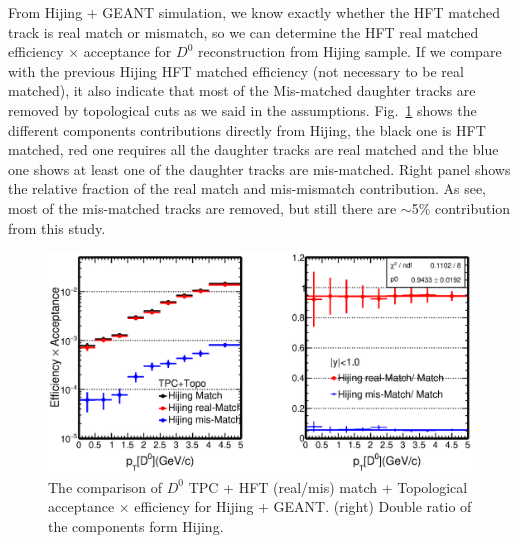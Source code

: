 

From Hijing + GEANT simulation, we know exactly whether the HFT matched track is real match or mismatch, so we can determine the HFT real matched efficiency $\times$ acceptance for $D^0$ reconstruction from Hijing sample. If we compare with the previous Hijing HFT matched efficiency (not necessary to be real matched), it also indicate that most of the Mis-matched daughter tracks are removed by topological cuts as we said in the assumptions. Fig.~\ref{d0hfttopoAlleff} shows the different components contributions directly from Hijing, the black one is HFT matched, red one requires all the daughter tracks are real matched and the blue one shows at least one of the daughter tracks are mis-matched. Right panel shows the relative fraction of the real match and mis-mismatch contribution. As see, most of the mis-matched tracks are removed, but still there are $\sim$5\% contribution from this study.

\begin{figure}[htbp]
\centering
\includegraphics[keepaspectratio,width=1.0\textwidth,angle=0]{figure/Run14_D0HFT/ALL_Physics_FastHijingVsPureHijing_HFTTopo.eps}
\caption{The comparison of $D^0$ TPC + HFT (real/mis) match + Topological acceptance $\times$ efficiency for Hijing + GEANT. (right) Double ratio of the components form Hijing.}
\label{d0hfttopoAlleff}
\end{figure}

